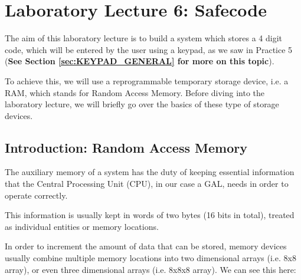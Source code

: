 \section{Laboratory Lecture 6: Safecode}

The aim of this laboratory lecture is to build a system which stores a 4 digit code, which will be entered by the user using a keypad, as we saw in Practice 5 (\textbf{See Section \ref{sec:KEYPAD_GENERAL} for more on this topic}).\medskip

To achieve this, we will use a reprogrammable temporary storage device, i.e. a RAM, which stands for Random Access Memory. Before diving into the laboratory lecture, we will briefly go over the basics of these type of storage devices.


\subsection{Introduction: Random Access Memory}

The auxiliary memory of a system has the duty of keeping essential information that the Central Processing Unit (CPU), in our case a GAL, needs in order to operate correctly.\medskip

This information is usually kept in words of two bytes (16 bits in total), treated as individual entities or memory locations.\medskip

In order to increment the amount of data that can be stored, memory devices usually combine multiple memory locations into two dimensional arrays (i.e. 8x8 array), or even three dimensional arrays (i.e. 8x8x8 array). We can see this here:\medskip

